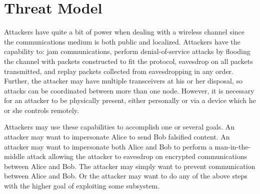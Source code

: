 \documentclass[12pt]{report}
\begin{document}
\section{Threat Model}
Attackers have quite a bit of power when dealing with a wireless channel since the communications medium is both public and localized. Attackers have the capability to: jam communications, perform denial-of-service attacks by flooding the channel with packets constructed to fit the protocol, eavesdrop on all packets transmitted, and replay packets collected from eavesdropping in any order. Further, the attacker may have multiple transceivers at his or her disposal, so attacks can be coordinated between more than one node. However, it is necessary for an attacker to be physically present, either personally or via a device which he or she controls remotely. \par

Attackers may use these capabilities to accomplish one or several goals. An attacker may want to impersonate Alice to send Bob falsified content. An attacker may want to impersonate both Alice and Bob to perform a man-in-the-middle attack allowing the attacker to eavesdrop on encrypted communications between Alice and Bob. The attacker may simply want to prevent communication between Alice and Bob. Or the attacker may want to do any of the above steps with the higher goal of exploiting some subsystem. \par
\end{document}
